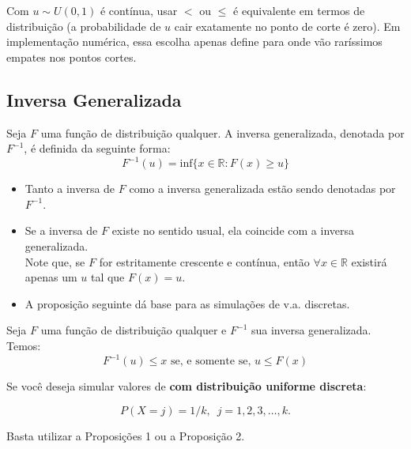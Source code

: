\documentclass[
  letterpaper,
  DIV=11,
  numbers=noendperiod]{scrreprt}
\providecommand{\tightlist}{%
  \setlength{\itemsep}{0pt}\setlength{\parskip}{0pt}}\usepackage{longtable,booktabs,array}
\begin{document}
\begin{tcolorbox}[enhanced jigsaw, coltitle=black, bottomtitle=1mm, toprule=.15mm, arc=.35mm, colframe=quarto-callout-important-color-frame, breakable, opacityback=0, bottomrule=.15mm, rightrule=.15mm, titlerule=0mm, toptitle=1mm, title={🔎 \textbf{Observação}:}, leftrule=.75mm, opacitybacktitle=0.6, left=2mm, colback=white, colbacktitle=quarto-callout-important-color!10!white]

Com \(u \sim U(0,1)\) é contínua, usar \(<\) ou \(\leq\) é equivalente
em termos de distribuição (a probabilidade de \(u\) cair exatamente no
ponto de corte é zero). Em implementação numérica, essa escolha apenas
define para onde vão raríssimos empates nos pontos cortes.

\end{tcolorbox}

\subsection*{Inversa Generalizada}\label{inversa-generalizada}

Seja \(F\) uma função de distribuição qualquer. A inversa generalizada,
denotada por \(F^{-1}\), é definida da seguinte forma:
\[ F^{-1}(u) = \mbox{inf}\{x \in \mathbb{R}: F(x)\geq u \}\]

\begin{itemize}
\tightlist
\item
  Tanto a inversa de \(F\) como a inversa generalizada estão sendo
  denotadas por \(F^{-1}\).
\item
  Se a inversa de \(F\) existe no sentido usual, ela coincide com a
  inversa generalizada.\\
  Note que, se \(F\) for estritamente crescente e contínua, então
  \(\forall x \in \mathbb{R}\) existirá apenas um \(u\) tal que
  \(F(x) = u\).
\item
  A proposição seguinte dá base para as simulações de v.a. discretas.
\end{itemize}

Seja \(F\) uma função de distribuição qualquer e \(F^{-1}\) sua inversa
generalizada. Temos:
\[F^{-1}(u) \leq x \mbox{ se, e somente se, } u \leq F(x)\]

Se você deseja simular valores de
\Xn  \textbf{com distribuição uniforme discreta}:

\[P(X=j)=1/k, \, \,\, j=1,2,3,\ldots, k.\]

Basta utilizar a Proposições 1 ou a Proposição 2.
\end{document}
